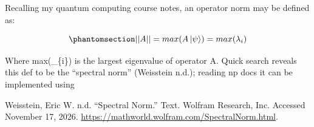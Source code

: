 \documentclass[
  letterpaper,
  DIV=11,
  numbers=noendperiod]{scrartcl}
\newlength{\cslhangindent}
\newenvironment{CSLReferences}[2] %
 {\begin{list}{}{%
  \setlength{\itemindent}{0pt}
  \setlength{\leftmargin}{0pt}
  \setlength{\parsep}{0pt}
  \ifodd #1
   \setlength{\leftmargin}{\cslhangindent}
   \setlength{\itemindent}{-1\cslhangindent}
  \fi
  \setlength{\itemsep}{#2\baselineskip}}}
 {\end{list}}
\begin{document}
Recalling my quantum computing course notes, an operator norm may be
defined as:

\begin{equation}\phantomsection\label{eq-operatorNorm}{
||A||=max(A\ket{\psi})=max(\lambda_{i})
}\end{equation}

Where max(\lambda\_\{i\}) is the largest eigenvalue of operator A. Quick
search reveals this def to be the ``spectral norm'' (Weisstein n.d.);
reading np docs it can be implemented using

\label{refs}
\begin{CSLReferences}{1}{0}
Weisstein, Eric W. n.d. {``Spectral {Norm}.''} Text. Wolfram Research,
Inc. Accessed November 17, 2026.
\url{https://mathworld.wolfram.com/SpectralNorm.html}.

\end{CSLReferences}
\end{document}
